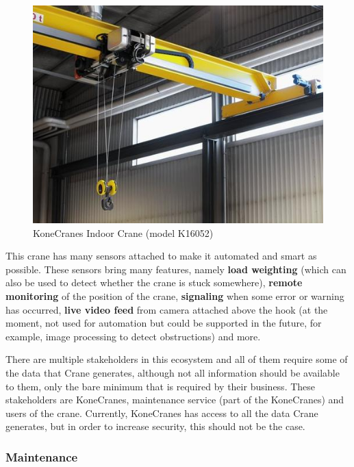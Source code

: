 \begin{figure}[ht]
	\begin{center}
		\includegraphics[width=\textwidth]{images/KoneCranes-CraneK16052}
		\caption{KoneCranes Indoor Crane (model K16052)}
		\label{fig:KoneCranes-CraneK16052}
	\end{center}
\end{figure}

This crane has many sensors attached to make it automated and smart as possible. These sensors
bring many features, namely {\bf load weighting} (which can also be used to detect
whether the crane is stuck somewhere), {\bf remote monitoring } of the position of the crane,
{\bf signaling} when some error or warning has occurred, {\bf live video feed } from camera attached
above the hook (at the moment, not used for automation but could be supported in the future,
for example, image processing to detect obstructions) and more.

There are multiple stakeholders in this ecosystem and all of them require some of the data
that Crane generates, although not all information should be available to them, only
the bare minimum that is required by their business. These stakeholders are KoneCranes, 
maintenance service (part of the KoneCranes) and users of the crane. Currently, KoneCranes has access to all the data Crane generates, but in order to 
increase security, this should not be the case.

\subsubsection{Maintenance}

